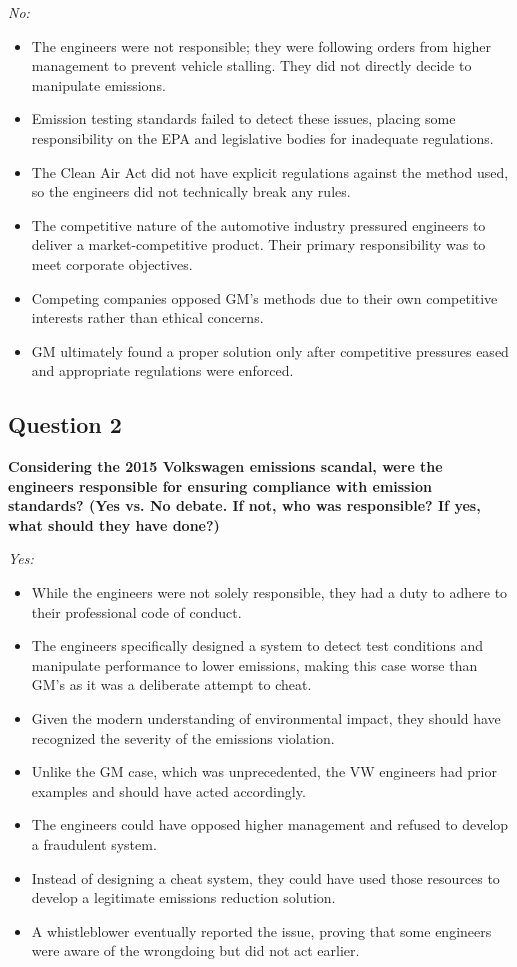 \documentclass{article}
\begin{document}
\textit{No:}
\begin{itemize}
    \item The engineers were not responsible; they were following orders from higher management to prevent vehicle stalling. They did not directly decide to manipulate emissions.
    \item Emission testing standards failed to detect these issues, placing some responsibility on the EPA and legislative bodies for inadequate regulations.
    \item The Clean Air Act did not have explicit regulations against the method used, so the engineers did not technically break any rules.
    \item The competitive nature of the automotive industry pressured engineers to deliver a market-competitive product. Their primary responsibility was to meet corporate objectives.
    \item Competing companies opposed GM’s methods due to their own competitive interests rather than ethical concerns.
    \item GM ultimately found a proper solution only after competitive pressures eased and appropriate regulations were enforced.
\end{itemize}

\subsection*{Question 2}
\textbf{Considering the 2015 Volkswagen emissions scandal, were the engineers responsible for ensuring compliance with emission standards? (Yes vs. No debate. If not, who was responsible? If yes, what should they have done?)}

\textit{Yes:}
\begin{itemize}
    \item While the engineers were not solely responsible, they had a duty to adhere to their professional code of conduct.
    \item The engineers specifically designed a system to detect test conditions and manipulate performance to lower emissions, making this case worse than GM’s as it was a deliberate attempt to cheat.
    \item Given the modern understanding of environmental impact, they should have recognized the severity of the emissions violation.
    \item Unlike the GM case, which was unprecedented, the VW engineers had prior examples and should have acted accordingly.
    \item The engineers could have opposed higher management and refused to develop a fraudulent system.
    \item Instead of designing a cheat system, they could have used those resources to develop a legitimate emissions reduction solution.
    \item A whistleblower eventually reported the issue, proving that some engineers were aware of the wrongdoing but did not act earlier.
\end{itemize}
\end{document}

